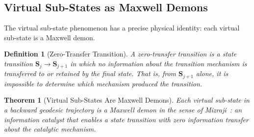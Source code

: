 \documentclass[12pt,twocolumn]{article}
\newtheorem{theorem}{Theorem}[section]
\newtheorem{definition}{Definition}[section]
\begin{document}
\subsection{Virtual Sub-States as Maxwell Demons}

The virtual sub-state phenomenon has a precise physical identity: each virtual sub-state is a Maxwell demon.

\begin{definition}[Zero-Transfer Transition]
\label{def:zero_transfer}
A \emph{zero-transfer transition} is a state transition $\mathbf{S}_j \to \mathbf{S}_{j+1}$ in which no information about the transition mechanism is transferred to or retained by the final state. That is, from $\mathbf{S}_{j+1}$ alone, it is impossible to determine which mechanism produced the transition.
\end{definition}

\begin{theorem}[Virtual Sub-States Are Maxwell Demons]
\label{thm:virtual_demons}
Each virtual sub-state in a backward geodesic trajectory is a Maxwell demon in the sense of Mizraji~\cite{mizraji2021biological}: an information catalyst that enables a state transition with zero information transfer about the catalytic mechanism.
\end{theorem}
\end{document}
